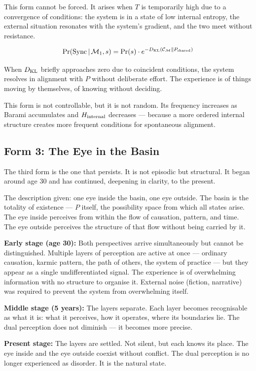 \documentclass[12pt, a4paper]{article}
\begin{document}
This form cannot be forced. It arises when $T$ is temporarily high due to a
convergence of conditions: the system is in a state of low internal entropy,
the external situation resonates with the system's gradient, and the two meet
without resistance.

\begin{formalbox}[title={Form 2: Synchronous Alignment}]
\[
  \Pr(\text{Sync}\,|\,\mathcal{M}_1, s)
  = \Pr(s) \cdot e^{-D_{\rm KL}(\mathcal{C}_\mathcal{M}\|P_{\rm shared})}
\]

When $D_{\rm KL}$ briefly approaches zero due to coincident conditions,
the system resolves in alignment with $P$ without deliberate effort.
The experience is of things moving by themselves, of knowing without deciding.

This form is not controllable, but it is not random.
Its frequency increases as Barami accumulates and $H_{\rm internal}$ decreases ---
because a more ordered internal structure creates more frequent conditions
for spontaneous alignment.
\end{formalbox}

\subsection{Form 3: The Eye in the Basin}

The third form is the one that persists. It is not episodic but structural.
It began around age 30 and has continued, deepening in clarity, to the present.

The description given: one eye inside the basin, one eye outside.
The basin is the totality of existence --- $P$ itself, the possibility space
from which all states arise. The eye inside perceives from within the flow
of causation, pattern, and time. The eye outside perceives the structure
of that flow without being carried by it.

\begin{formalbox}[title={Form 3: The Eye in the Basin}]
\textbf{Early stage (age 30):}
Both perspectives arrive simultaneously but cannot be distinguished.
Multiple layers of perception are active at once --- ordinary causation,
karmic pattern, the path of others, the system of practice --- but they
appear as a single undifferentiated signal. The experience is of overwhelming
information with no structure to organise it.
External noise (fiction, narrative) was required to prevent the system
from overwhelming itself.

\textbf{Middle stage (5 years):}
The layers separate. Each layer becomes recognisable as what it is:
what it perceives, how it operates, where its boundaries lie.
The dual perception does not diminish --- it becomes more precise.

\textbf{Present stage:}
The layers are settled. Not silent, but each knows its place.
The eye inside and the eye outside coexist without conflict.
The dual perception is no longer experienced as disorder.
It is the natural state.
\end{formalbox}
\end{document}
